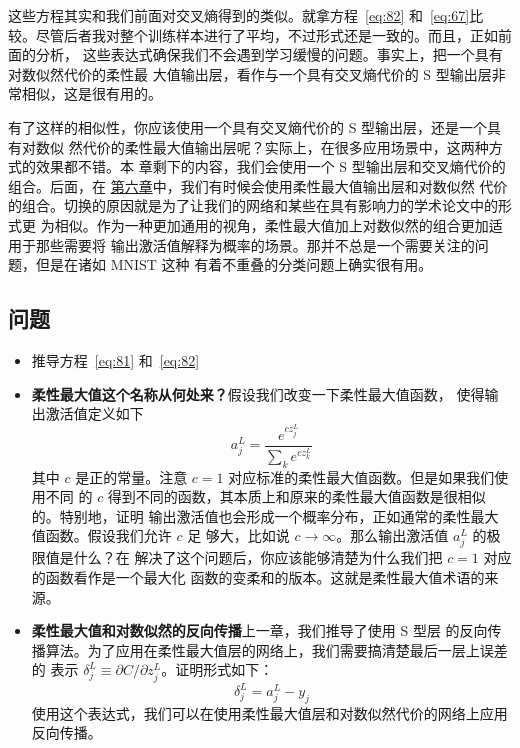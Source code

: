 这些方程其实和我们前面对交叉熵得到的类似。就拿方程~\eqref{eq:82} 和~\eqref{eq:67}比
较。尽管后者我对整个训练样本进行了平均，不过形式还是一致的。而且，正如前面的分析，
这些表达式确保我们不会遇到学习缓慢的问题。事实上，把一个具有对数似然代价的柔性最
大值输出层，看作与一个具有交叉熵代价的 S 型输出层非常相似，这是很有用的。

有了这样的相似性，你应该使用一个具有交叉熵代价的 S 型输出层，还是一个具有对数似
然代价的柔性最大值输出层呢？实际上，在很多应用场景中，这两种方式的效果都不错。本
章剩下的内容，我们会使用一个 S 型输出层和交叉熵代价的组合。后面，在%
\hyperref[ch:Deeplearning]{第六章}中，我们有时候会使用柔性最大值输出层和对数似然
代价的组合。切换的原因就是为了让我们的网络和某些在具有影响力的学术论文中的形式更
为相似。作为一种更加通用的视角，柔性最大值加上对数似然的组合更加适用于那些需要将
输出激活值解释为概率的场景。那并不总是一个需要关注的问题，但是在诸如 MNIST 这种
有着不重叠的分类问题上确实很有用。

\subsection*{问题}

\begin{itemize}
\item 推导方程~\eqref{eq:81} 和~\eqref{eq:82}
\item \textbf{柔性最大值这个名称从何处来？}\quad 假设我们改变一下柔性最大值函数，
  使得输出激活值定义如下
  \begin{equation}
    a^L_j = \frac{e^{c z^L_j}}{\sum_k e^{c z^L_k}}
    \label{eq:83}\tag{83}
  \end{equation}
  其中 $c$ 是正的常量。注意 $c=1$ 对应标准的柔性最大值函数。但是如果我们使用不同
  的 $c$ 得到不同的函数，其本质上和原来的柔性最大值函数是很相似的。特别地，证明
  输出激活值也会形成一个概率分布，正如通常的柔性最大值函数。假设我们允许 $c$ 足
  够大，比如说 $c\rightarrow \infty$。那么输出激活值 $a_j^L$ 的极限值是什么？在
  解决了这个问题后，你应该能够清楚为什么我们把 $c=1$ 对应的函数看作是一个最大化
  函数的变柔和的版本。这就是柔性最大值术语的来源。
\item \textbf{柔性最大值和对数似然的反向传播}\quad 上一章，我们推导了使用 S 型层
  的反向传播算法。为了应用在柔性最大值层的网络上，我们需要搞清楚最后一层上误差的
  表示 $\delta^L_j \equiv \partial C / \partial z^L_j$。证明形式如下：
  \begin{equation}
    \delta^L_j = a^L_j -y_j
    \label{eq:84}\tag{84}
  \end{equation}
  使用这个表达式，我们可以在使用柔性最大值层和对数似然代价的网络上应用反向传播。
\end{itemize}

